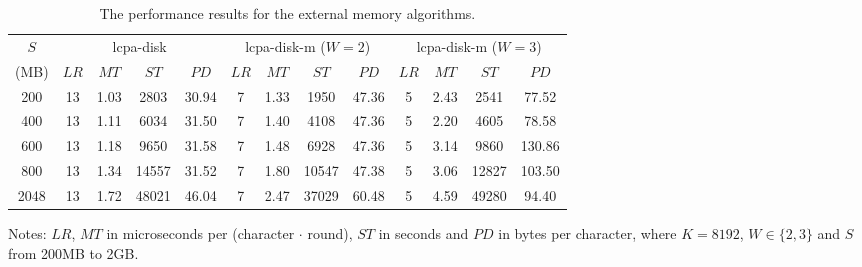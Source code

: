 \documentclass[10pt,journal,letterpaper,compsoc]{IEEEtran}
\begin{document}
\begin{CJK*}{GBK}{song}
\begin{table}[htbp!]
\begin{threeparttable}
\caption{The performance results for the external memory algorithms.}
\label{tbl:disk_vs_diskm}
\centering
\begin{tabular}{|c|c|c|c|c|c|c|c|c|c|c|c|c|}
\hline
$S$ & \multicolumn{4}{c|}{lcpa-disk} & \multicolumn{4}{c|}{lcpa-disk-m ($W = 2$)} & \multicolumn{4}{c|}{lcpa-disk-m ($W = 3$)}\\
\cline{2-13}
(MB) & $LR$ & $MT$ & $ST$ & $PD$ & $LR$ & $MT$ & $ST$ & $PD$ & $LR$ & $MT$ & $ST$ & $PD$\\
\hline
200 & 13 & 1.03 & 2803 & 30.94 & 7 & 1.33 & 1950 & 47.36 & 5 & 2.43 & 2541 & 77.52\\
\hline
400 & 13 & 1.11 & 6034 & 31.50 & 7 & 1.40 & 4108 & 47.36 & 5 & 2.20 & 4605 & 78.58\\
\hline
600 & 13 & 1.18 & 9650 & 31.58 & 7 & 1.48 & 6928 & 47.36 & 5 & 3.14 & 9860 & 130.86\\
\hline
800 & 13 & 1.34 & 14557 & 31.52 & 7 & 1.80 & 10547 & 47.38 & 5 & 3.06 & 12827 & 103.50\\
\hline
2048 & 13 & 1.72 & 48021 & 46.04 & 7 & 2.47 & 37029 & 60.48 & 5 & 4.59 & 49280 & 94.40\\
\hline
\end{tabular}
\begin{tablenotes}
\item Notes: $LR$, $MT$ in microseconds per (character $\cdot$ round), $ST$ in seconds and $PD$ in bytes per character, where $K=8192$, $W \in \{2,3\}$ and $S$ from 200MB to 2GB.
\end{tablenotes}
\end{threeparttable}
\centering
\end{table}


\end{CJK*}
\end{document}
